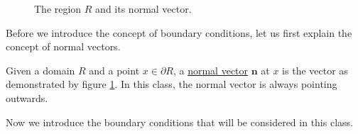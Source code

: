 \begin{figure}[H]
    \centering 
    \caption{The region $R$ and its normal vector.} 
    \label{fig.normal_vector} 
\end{figure}

Before we introduce the concept of boundary conditions, let us first explain the concept of normal vectors.

\begin{definition} Given a domain $R$ and a point $x\in \partial R$, a \underline{normal vector} $\mathbf{n}$ at $x$ is the vector as demonstrated by figure \ref{fig.normal_vector}. In this class, the normal vector is always pointing outwards. 
    
\end{definition}

Now we introduce the boundary conditions that will be considered in this class.

